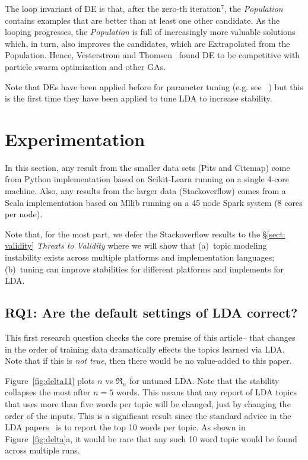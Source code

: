 \documentclass[10pt,conference]{IEEEtran}
\theoremstyle{break}
\begin{document}
The loop invariant of DE is that, after the zero-th iteration$^7$, the \textit{Population}
contains examples that are better than at least one other candidate.
As the looping progresses, the \textit{Population} is full of increasingly more valuable solutions
which, in turn, also improves the candidates, which are Extrapolated from the Population.
Hence, Vesterstrom and Thomsen~\cite{vesterstrom2004comparative} found DE to be
competitive with particle swarm optimization and other GAs.

Note that DEs have been
applied before for parameter tuning (e.g. see~\cite{panichella2013effectively, lohar2013improving, sun2015msr4sm,%
omran2005differential,chiha2012tuning, fu2016tuning} ) but this is the first time they have been
applied to tune LDA to increase stability.



\section{Experimentation}


In this section,
 any result from the smaller data sets (Pits and Citemap) come
from Python implementation based on Scikit-Learn running on a single 4-core machine.
Also,
  any results from the larger data (Stackoverflow) comes from a Scala implementation
  based on Mllib running on a 45 node Spark system (8 cores per node).
  
  Note that, for the most part, we defer the Stackoverflow results to the \S\ref{sect: validity} {\em Threats to Validity} where we will show that (a)~topic modeling instability
  exists across multiple platforms and  implementation languages; (b)~tuning
  can improve stabilities for different platforms and implements for LDA.


\subsection{\textbf{RQ1: Are the default settings of LDA correct?}}


This first research question checks the core premise of this article-- that changes
in the order of training data dramatically effects the topics learned via LDA.
Note that if this is {\em not true}, then there would be no value-added to this paper.


Figure~\ref{fig:delta11}   plots $n$ vs $\Re_n$ for untuned  LDA.
Note that the  stability collapses the most after $n=5$ words. This means
  that any report of LDA topics that uses more than five words per topic will
  be changed, just by changing the order of the inputs. This is a significant result
  since the standard advice in the LDA papers~\cite{panichella2013effectively, lukins2010bug}
  is to report the top 10 words per topic. As shown in Figure~\ref{fig:delta}a, it would
  be rare that any such 10 word topic would be found across multiple runs.
  
\end{document}
